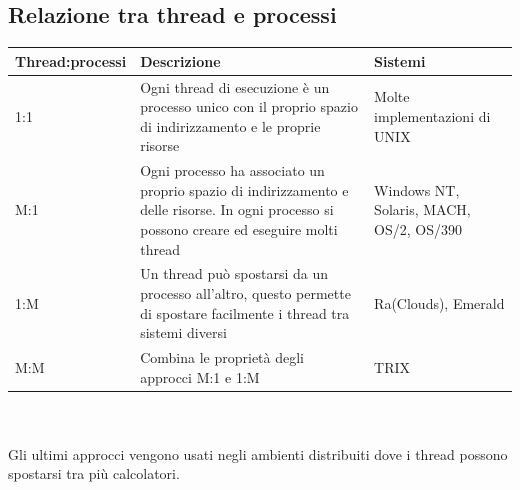 \documentclass[12pt, letterpaper]{report}
\begin{document}
	\subsection{Relazione tra thread e processi}
	\begin{tabular}{m{} | m{5cm} | m{3cm}}
		\textbf{Thread:processi} &\textbf{Descrizione} & \textbf{Sistemi} \\
		\hline
		1:1 & Ogni thread di esecuzione è un processo unico con il proprio spazio di indirizzamento e le proprie risorse & Molte implementazioni di UNIX \\
		\hline
		M:1 & Ogni processo ha associato un proprio spazio di indirizzamento e delle risorse. In ogni processo si possono creare ed eseguire molti thread & Windows NT, Solaris, MACH, OS/2, OS/390 \\
		\hline
		1:M & Un thread può spostarsi da un processo all'altro, questo permette di spostare facilmente i thread tra sistemi diversi & Ra(Clouds), Emerald \\
		\hline
		M:M & Combina le proprietà degli approcci M:1 e 1:M & TRIX
	\end{tabular} \\ \quad \\
	Gli ultimi approcci vengono usati negli ambienti distribuiti dove i thread possono spostarsi tra più calcolatori.
\end{document}
